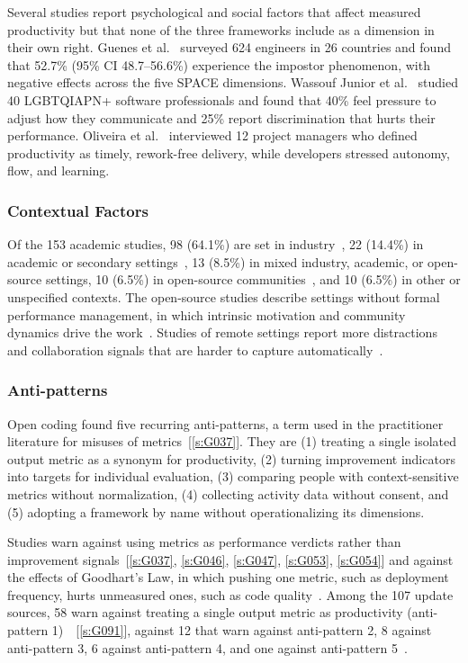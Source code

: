 \documentclass[preprint,number]{elsarticle}
\newcommand{\refG}[1]{\ref{s:#1}}
\begin{document}
Several studies report psychological and social factors that affect measured productivity but that none of the three frameworks include as a dimension in their own right. Guenes et al.~\cite{P0112} surveyed 624 engineers in 26 countries and found that 52.7\% (95\% CI 48.7--56.6\%) experience the impostor phenomenon, with negative effects across the five SPACE dimensions. Wassouf Junior et al.~\cite{P0473} studied 40 LGBTQIAPN+ software professionals and found that 40\% feel pressure to adjust how they communicate and 25\% report discrimination that hurts their performance.
Oliveira et al.~\cite{P1297} interviewed 12 project managers who defined productivity as timely, rework-free delivery, while developers stressed autonomy, flow, and learning.

\subsubsection{Contextual Factors}

Of the 153 academic studies, 98 (64.1\%) are set in industry~\cite{P0017, P0061, P0271, P0556}, 22 (14.4\%) in academic or secondary settings~\cite{P1286}, 13 (8.5\%) in mixed industry, academic, or open-source settings, 10 (6.5\%) in open-source communities~\cite{P0162, P0481, P0028}, and 10 (6.5\%) in other or unspecified contexts.
The open-source studies describe settings without formal performance management, in which intrinsic motivation and community dynamics drive the work~\cite{P0162, P0028}. Studies of remote settings report more distractions and collaboration signals that are harder to capture automatically~\cite{P1503, P0611}.

\subsubsection{Anti-patterns}

Open coding found five recurring anti-patterns, a term used in the practitioner literature for misuses of metrics~[\refG{G037}]. They are (1) treating a single isolated output metric as a synonym for productivity, (2) turning improvement indicators into targets for individual evaluation, (3) comparing people with context-sensitive metrics without normalization, (4) collecting activity data without consent, and (5) adopting a framework by name without operationalizing its dimensions.

Studies warn against using metrics as performance verdicts rather than improvement signals~[\refG{G037}, \refG{G046}, \refG{G047}, \refG{G053}, \refG{G054}] and against the effects of Goodhart's Law, in which pushing one metric, such as deployment frequency, hurts unmeasured ones, such as code quality~\cite{P0021, P0027, P0249}. Among the 107 update sources, 58 warn against treating a single output metric as productivity (anti-pattern 1)~\cite{P2100, P2103}~[\refG{G091}], against 12 that warn against anti-pattern 2, 8 against anti-pattern 3, 6 against anti-pattern 4, and one against anti-pattern 5~\cite{P2016}.
\end{document}
